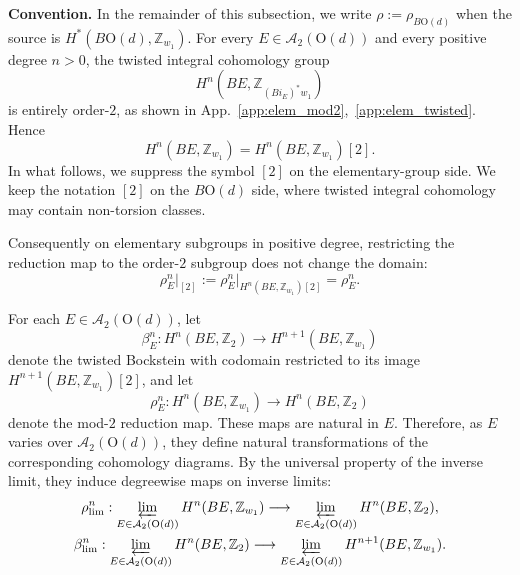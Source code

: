 \documentclass[aps,prx,reprint,superscriptaddress,twocolumn,amsmath,amssymb,amsfonts, nofootinbib]{revtex4-2}
\newcommand{\Z}{\mathbb{Z}}
\theoremstyle{apsstyle}
\begin{document}
\medskip 

\noindent \textbf{Convention.}
In the remainder of this subsection, we write $\rho:=\rho_{B\mathrm{O}(d)}$ when the source is $H^*(B\mathrm{O}(d),\Z_{w_1})$. For every $E\in\mathcal A_2(\mathrm{O}(d))$ and every positive degree $n>0$, the twisted integral cohomology group
\begin{equation}
H^n(BE,\mathbb Z_{(Bi_E)^*w_1})
\end{equation}
is entirely order-$2$, as shown in App.~\ref{app:elem_mod2},~\ref{app:elem_twisted}. Hence
\begin{equation}
H^n(BE,\mathbb Z_{w_1}) = H^n(BE,\mathbb Z_{w_1})[2].
\end{equation}
In what follows, we suppress the symbol $[2]$ on the elementary-group side. We keep the notation $[2]$ on the $B\mathrm{O}(d)$ side, where twisted integral cohomology may contain non-torsion classes.

\noindent Consequently on elementary subgroups in positive degree, restricting the reduction map to the order-$2$ subgroup does not change the domain:
\begin{equation}
\rho^{n}_E\vert_{[2]} := \rho^{n}_E\big\vert_{H^{n}(BE,\Z_{w_1})[2]}=\rho^{n}_{E}.
\end{equation}

\bigskip 

\noindent For each $E\in\mathcal A_2(\mathrm{O}(d))$, let
\begin{equation}
\beta_E^n: H^n(BE,\mathbb Z_2) \longrightarrow H^{n+1}(BE,\mathbb Z_{w_1})
\label{eq:Bockstein_E}
\end{equation}
denote the twisted Bockstein with codomain restricted to its image $H^{n+1}(BE,\mathbb Z_{w_1})[2]$, and let
\begin{equation}
\rho_E^n: H^n(BE,\mathbb Z_{w_1}) \longrightarrow H^n(BE,\mathbb Z_2)
\label{eq:reduction_E}
\end{equation}
denote the mod-$2$ reduction map. These maps are natural in $E$. Therefore, as $E$ varies over $\mathcal A_2(\mathrm{O}(d))$, they define natural transformations of the corresponding cohomology diagrams. By the universal property of the inverse limit, they induce degreewise maps on inverse limits:
\begin{gather}
    \rho^{n}_{\lim}: \varprojlim_{E\in\mathcal A_2(\mathrm{O}(d))} H^n(BE,\Z_{w_1})
\longrightarrow \varprojlim_{E\in\mathcal A_2(\mathrm{O}(d))} H^n(BE,\Z_2),
    \label{eq:rho_lim}\\
    \beta^{n}_{\lim}: \varprojlim_{E\in\mathcal A_2(\mathrm{O}(d))} H^n(BE,\Z_{2})
\longrightarrow \varprojlim_{E\in\mathcal A_2(\mathrm{O}(d))} H^{n+1}(BE,\Z_{w_{1}}).
    \label{eq:beta_lim}
\end{gather}
\end{document}
